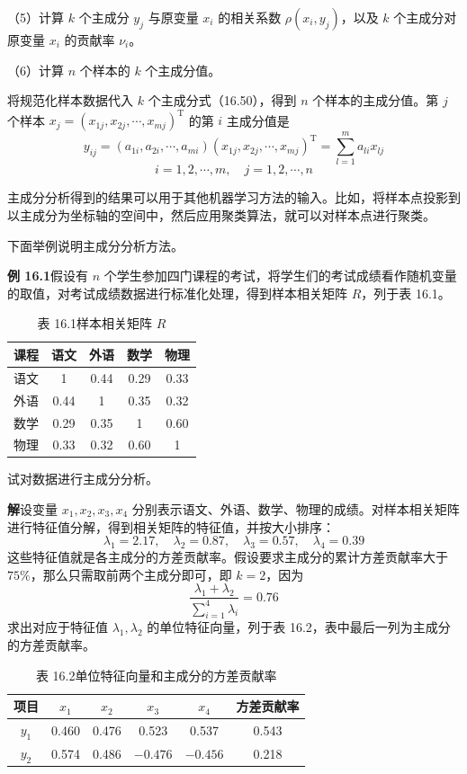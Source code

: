 \documentclass[UTF8,12pt,a4paper,fontset=fandol]{ctexart}
\begin{document}
（5）计算 $k$ 个主成分 $y_j$ 与原变量 $x_i$ 的相关系数 $\rho(x_i,y_j)$，以及 $k$ 个主成分对原变量 $x_i$ 的贡献率 $\nu_i$。

（6）计算 $n$ 个样本的 $k$ 个主成分值。

将规范化样本数据代入 $k$ 个主成分式（16.50），得到 $n$ 个样本的主成分值。第 $j$ 个样本 $x_j=(x_{1j},x_{2j},\cdots,x_{mj})^{\mathrm{T}}$ 的第 $i$ 主成分值是
\[
y_{ij}=(a_{1i},a_{2i},\cdots,a_{mi})(x_{1j},x_{2j},\cdots,x_{mj})^{\mathrm{T}}
=\sum_{l=1}^m a_{li}x_{lj}
\]
\[
i=1,2,\cdots,m,\quad j=1,2,\cdots,n
\]

主成分分析得到的结果可以用于其他机器学习方法的输入。比如，将样本点投影到以主成分为坐标轴的空间中，然后应用聚类算法，就可以对样本点进行聚类。

下面举例说明主成分分析方法。

\noindent\textbf{例 16.1}\quad 假设有 $n$ 个学生参加四门课程的考试，将学生们的考试成绩看作随机变量的取值，对考试成绩数据进行标准化处理，得到样本相关矩阵 $R$，列于表 16.1。

\begin{table}[htbp]
\centering
\caption*{表 16.1\quad 样本相关矩阵 $R$}
\begin{tabular}{ccccc}
\toprule
课程 & 语文 & 外语 & 数学 & 物理\\
\midrule
语文 & 1 & 0.44 & 0.29 & 0.33\\
外语 & 0.44 & 1 & 0.35 & 0.32\\
数学 & 0.29 & 0.35 & 1 & 0.60\\
物理 & 0.33 & 0.32 & 0.60 & 1\\
\bottomrule
\end{tabular}
\end{table}

试对数据进行主成分分析。

\noindent\textbf{解}\quad 设变量 $x_1,x_2,x_3,x_4$ 分别表示语文、外语、数学、物理的成绩。对样本相关矩阵进行特征值分解，得到相关矩阵的特征值，并按大小排序：
\[
\lambda_1=2.17,\quad \lambda_2=0.87,\quad \lambda_3=0.57,\quad \lambda_4=0.39
\]
这些特征值就是各主成分的方差贡献率。假设要求主成分的累计方差贡献率大于 $75\%$，那么只需取前两个主成分即可，即 $k=2$，因为
\[
\frac{\lambda_1+\lambda_2}{\displaystyle\sum_{i=1}^4\lambda_i}=0.76
\]
求出对应于特征值 $\lambda_1,\lambda_2$ 的单位特征向量，列于表 16.2，表中最后一列为主成分的方差贡献率。

\begin{table}[htbp]
\centering
\caption*{表 16.2\quad 单位特征向量和主成分的方差贡献率}
\begin{tabular}{cccccc}
\toprule
项目 & $x_1$ & $x_2$ & $x_3$ & $x_4$ & 方差贡献率\\
\midrule
$y_1$ & 0.460 & 0.476 & 0.523 & 0.537 & 0.543\\
$y_2$ & 0.574 & 0.486 & $-0.476$ & $-0.456$ & 0.218\\
\bottomrule
\end{tabular}
\end{table}
\end{document}
